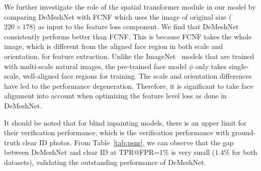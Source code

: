 \documentclass[10pt,twocolumn,letterpaper]{article}
\begin{document}
We further investigate the role of the spatial transformer module in our model by comparing DeMeshNet with FCNF which uses the image of original size ($220\times 178$) as input to the feature loss component.
We find that DeMeshNet consistently performs better than FCNF. This is because FCNF takes the whole image, which is different from the aligned face region in both scale and orientation, for feature extraction. Unlike the ImageNet~\cite{russakovsky2015imagenet} models that are trained with multi-scale natural images, the pre-trained face model $\phi$ only takes single-scale, well-aligned face regions for training. The scale and orientation differences have led to the performance degeneration. Therefore, it is significant to take face alignment into account when optimizing the feature level loss as done in DeMeshNet.



It should be noted that for blind inpainting models, there is an upper limit for their verification performance, which is the verification performance with ground-truth clear ID photos. From Table~\ref{tab:psnr}, we can observe that the gap between DeMeshNet and clear ID at TPR@FPR=1\% is very small ($1.4\%$ for both datasets), validating the outstanding performance of DeMeshNet.

\end{document}
